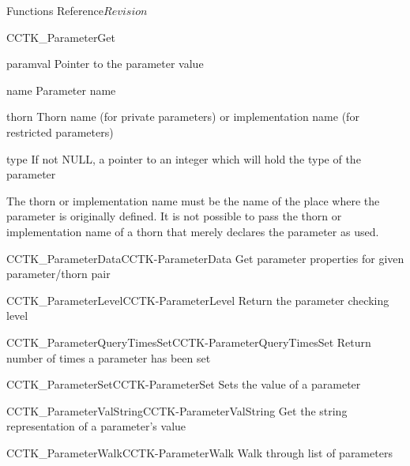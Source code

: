 \begin{cactuspart}{ Functions Reference}{}{$Revision$}
\begin{FunctionDescription}{CCTK\_ParameterGet}
\begin{ResultSection}
\begin{Result}{paramval}
Pointer to the parameter value
\end{Result}
\end{ResultSection}

\begin{ParameterSection}
\begin{Parameter}{name}
Parameter name
\end{Parameter}
\begin{Parameter}{thorn}
Thorn name (for private parameters) or implementation name (for
restricted parameters)
\end{Parameter}
\begin{Parameter}{type}
If not NULL, a pointer to an integer which will hold the type of the
parameter
\end{Parameter}
\end{ParameterSection}

\begin{Discussion}
The thorn or implementation name must be the name of the place where
the parameter is originally defined.  It is not possible to pass the
thorn or implementation name of a thorn that merely declares the
parameter as used.
\end{Discussion}

\begin{SeeAlsoSection}
\begin{SeeAlso2}{CCTK\_ParameterData}{CCTK-ParameterData}
  Get parameter properties for given parameter/thorn pair
\end{SeeAlso2}
\begin{SeeAlso2}{CCTK\_ParameterLevel}{CCTK-ParameterLevel}
  Return the parameter checking level
\end{SeeAlso2}
\begin{SeeAlso2}{CCTK\_ParameterQueryTimesSet}{CCTK-ParameterQueryTimesSet}
  Return number of times a parameter has been set
\end{SeeAlso2}
\begin{SeeAlso2}{CCTK\_ParameterSet}{CCTK-ParameterSet}
  Sets the value of a parameter
\end{SeeAlso2}
\begin{SeeAlso2}{CCTK\_ParameterValString}{CCTK-ParameterValString}
  Get the string representation of a parameter's value
\end{SeeAlso2}
\begin{SeeAlso2}{CCTK\_ParameterWalk}{CCTK-ParameterWalk}
  Walk through list of parameters
\end{SeeAlso2}
\end{SeeAlsoSection}


\end{FunctionDescription}
\end{cactuspart}
